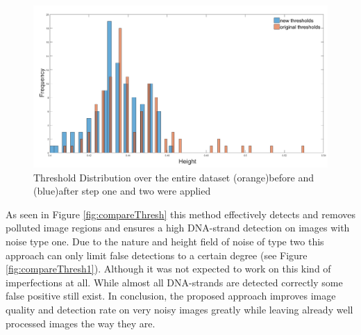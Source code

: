 \begin{figure}[!htb]
	\includegraphics[width=1\linewidth]{thresholds.png}
	\caption{Threshold Distribution over the entire dataset (orange)before and (blue)after step one and two were applied}%
	\label{fig:HistogramThresholds}
	\end{figure}
	As seen in Figure \ref{fig:compareThresh} this method effectively detects and removes polluted image regions and ensures a high DNA-strand detection on images with noise type one.
Due to the nature and height field of noise of type two this approach can only limit false detections to a certain degree (see Figure \ref{fig:compareThresh1}).
Although it was not expected to work on this kind of imperfections at all. While almost all DNA-strands are detected correctly some false positive still exist.
In conclusion, the proposed approach improves image quality and detection rate on very noisy images greatly while leaving already well processed images the way they are.

